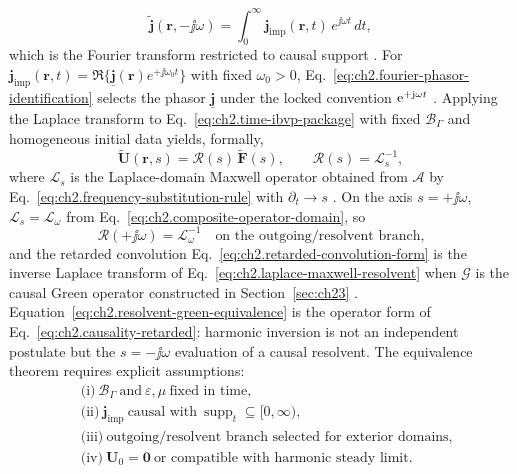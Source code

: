 \begin{equation}
\label{eq:ch2.fourier-phasor-identification}
\widetilde{\mathbf{j}}(\mathbf{r},-\jj\omega)
=
\int_0^\infty \mathbf{j}_{\mathrm{imp}}(\mathbf{r},t)\,e^{\jj\omega t}\,dt,
\end{equation}
which is the Fourier transform restricted to causal support
\cite{stratton1941}. For \(\mathbf{j}_{\mathrm{imp}}(\mathbf{r},t)=\Re\{\underline{\mathbf{j}}(\mathbf{r})e^{+\jj\omega_0 t}\}\)
with fixed \(\omega_0>0\), Eq.~\eqref{eq:ch2.fourier-phasor-identification}
selects the phasor \(\underline{\mathbf{j}}\) under the locked convention
$\mathrm{e}^{+\mathrm{j}\omega t}$ \cite{stratton1941}. Applying the Laplace transform to Eq.~\eqref{eq:ch2.time-ibvp-package} with fixed
\(\mathcal{B}_\Gamma\) and homogeneous initial data yields, formally,
\begin{equation}
\label{eq:ch2.laplace-maxwell-resolvent}
\widetilde{\mathbf{U}}(\mathbf{r},s)
=
\mathcal{R}(s)\,\widetilde{\mathbf{F}}(s),
\qquad
\mathcal{R}(s)=\mathcal{L}_s^{-1},
\end{equation}
where \(\mathcal{L}_s\) is the Laplace-domain Maxwell operator obtained from
\(\mathcal{A}\) by Eq.~\eqref{eq:ch2.frequency-substitution-rule} with
\(\partial_t\to s\) \cite{stratton1941}. On the axis \(s=+\jj\omega\),
\(\mathcal{L}_s=\mathcal{L}_\omega\) from Eq.~\eqref{eq:ch2.composite-operator-domain},
so
\begin{equation}
\label{eq:ch2.resolvent-green-equivalence}
\mathcal{R}(+\jj\omega)=\mathcal{L}_\omega^{-1}
\quad\text{on the outgoing/resolvent branch,}
\end{equation}
and the retarded convolution Eq.~\eqref{eq:ch2.retarded-convolution-form} is the
inverse Laplace transform of Eq.~\eqref{eq:ch2.laplace-maxwell-resolvent} when
\(\mathcal{G}\) is the causal Green operator constructed in Section~\ref{sec:ch23}
\cite{stratton1941}. Equation~\eqref{eq:ch2.resolvent-green-equivalence}
is the operator form of Eq.~\eqref{eq:ch2.causality-retarded}: harmonic
inversion is not an independent postulate but the \(s=-\jj\omega\) evaluation of a
causal resolvent.
The equivalence theorem requires explicit assumptions:
\begin{equation}
\label{eq:ch2.equivalence-assumptions}
\begin{aligned}
&\text{(i)}\ \mathcal{B}_\Gamma\ \text{and}\ \varepsilon,\mu\ \text{fixed in time},\\
&\text{(ii)}\ \mathbf{j}_{\mathrm{imp}}\ \text{causal with}\ \operatorname{supp}_t\subseteq[0,\infty),\\
&\text{(iii)}\ \text{outgoing/resolvent branch selected for exterior domains},\\
&\text{(iv)}\ \mathbf{U}_0=\mathbf{0}\ \text{or compatible with harmonic steady limit}.
\end{aligned}
\end{equation}
